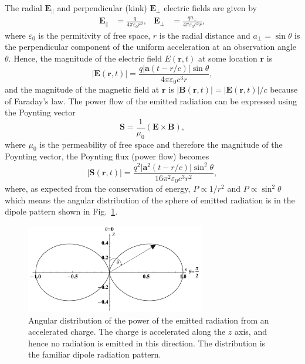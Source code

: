 \documentclass[../main.tex]{subfiles}
\begin{document}
The radial $\boldsymbol{E}_{\parallel}$ and perpendicular (kink) $\boldsymbol{E}_{\perp}$ electric fields are given by  
\begin{align}
\boldsymbol{E}_{\parallel} &= \frac{q}{4\pi\varepsilon_{0}r^{2}}, & \boldsymbol{E}_{\perp} &= \frac{qa_{\perp}}{4\pi\varepsilon_{0}c^{2}r},
\label{eq:dipole_E_fields}
\end{align}
where $\varepsilon_{0}$ is the permitivity of free space, $r$ is the radial distance and $a_{\perp}=\sin\theta$ is the perpendicular component of the uniform acceleration at an observation angle $\theta$. Hence, the magnitude of the electric field $E\left(\boldsymbol{r},t\right)$ at some location $\boldsymbol{r}$ is
\begin{equation}
\lvert\boldsymbol{E}\left(\boldsymbol{r},t\right)\rvert = \frac{q\lvert\boldsymbol{a}\left(t-r/c\right)\rvert\sin\theta}{4\pi\varepsilon_{0}c^{3}r},    
\end{equation}
and the magnitude of the magnetic field at $\boldsymbol{r}$ is $\lvert\boldsymbol{B}\left(\boldsymbol{r},t\right)\rvert = \lvert\boldsymbol{E}\left(\boldsymbol{r},t\right)\rvert/c$ because of Faraday's law. The power flow of the emitted radiation can be expressed using the Poynting vector
\begin{equation}
\boldsymbol{S} = \frac{1}{\mu_{0}}\left(\boldsymbol{E}\times\boldsymbol{B}\right),
\label{eq:Poynting_vector}
\end{equation}
where $\mu_{0}$ is the permeability of free space and therefore the magnitude of the Poynting vector, the Poynting flux (power flow) becomes 
\begin{equation}
\lvert\boldsymbol{S}\left(\boldsymbol{r},t\right)\rvert = \frac{q^{2}\lvert\boldsymbol{a}^{2}\left(t-r/c\right)\rvert\sin^{2}\theta}{16\pi^{2}\varepsilon_{0}c^{3}r^{2}},
\label{eq:Poynting_magnitude}
\end{equation}
where, as expected from the conservation of energy, $P \propto 1/r^{2}$ and $P \propto \sin^{2}\theta$ which means the angular distribution of the sphere of emitted radiation is in the dipole pattern shown in Fig.~\ref{fig:dipole_angular_distribution}.
\begin{figure}[!h]
\centering
\includegraphics[width=0.7\textwidth]{Figures/Photon_Production_by_Inverse_Compton_Scattering/dipole_angular_distribution_fixed.pdf}
\caption{Angular distribution of the power of the emitted radiation from an accelerated charge. The charge is accelerated along the $z$ axis, and hence no radiation is emitted in this direction. The distribution is the familiar dipole radiation pattern.}
\label{fig:dipole_angular_distribution}
\end{figure}
\end{document}
